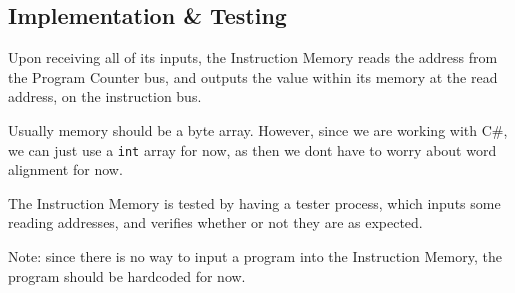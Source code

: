 \documentclass{beamer}
\begin{document}
\subsection{Implementation \& Testing}
\begin{frame}
    Upon receiving all of its inputs, the Instruction Memory reads the address
    from the Program Counter bus, and outputs the value within its memory at
    the read address, on the instruction bus.

    \vspace{\baselineskip}
    Usually memory should be a byte array. However, since we are working with
    C\#, we can just use a \texttt{int} array for now, as then we dont have to
    worry about word alignment for now.

    \vspace{\baselineskip}
    The Instruction Memory is tested by having a tester process, which inputs
    some reading addresses, and verifies whether or not they are as expected.

    \vspace{\baselineskip}
    Note: since there is no way to input a program into the Instruction Memory,
    the program should be hardcoded for now.
\end{frame}
\end{document}
